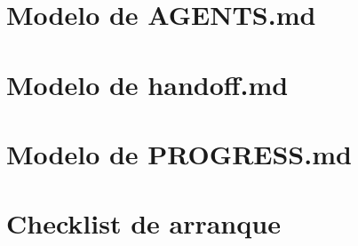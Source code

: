 \documentclass[11pt,a4paper]{article}
\begin{document}
\section{Modelo de AGENTS.md}\label{an:agents}


\section{Modelo de handoff.md}\label{an:handoff}


\section{Modelo de PROGRESS.md}\label{an:progress}


\section{Checklist de arranque}\label{an:checklist}

\end{document}
